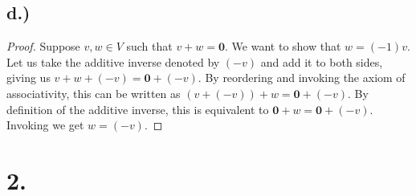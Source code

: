 \documentclass{article}
\begin{document}
\subsection*{d.)}

\begin{proof}
Suppose $v, w \in V$ such that $v + w = \mathbf{0}$. We want to show that $w = (-1)v$. Let us take the additive inverse denoted by $(-v)$ and add it to both sides, giving us $v + w + (-v) = \mathbf{0} + (-v)$. By reordering and invoking the axiom of associativity, this can be written as $(v + (-v)) + w = \mathbf{0} + (-v)$. By definition of the additive inverse, this is equivalent to $\mathbf{0} + w = \mathbf{0} + (-v)$. Invoking  we get $w = (-v)$.

\end{proof}

\section*{2.}

\end{document}
